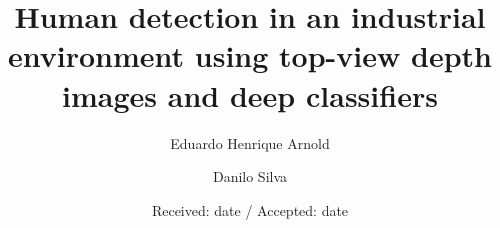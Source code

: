 \documentclass[twocolumn]{svjour3}
\begin{document}
\title{Human detection in an industrial environment using top-view depth images and deep classifiers}
%
\author{Eduardo Henrique Arnold \and Danilo Silva}



\date{Received: date / Accepted: date}

\maketitle






\nocite{*}







\end{document}
